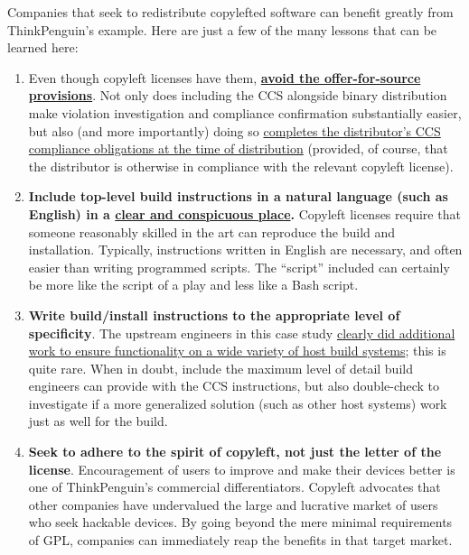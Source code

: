 Companies that seek to redistribute copylefted software can benefit greatly
from ThinkPenguin's example.  Here are just a few of the many lessons that
can be learned here:

\begin{enumerate}

\item Even though copyleft licenses have them,
  \hyperref[thinkpenguin-included-ccs]{\bf avoid the offer-for-source
    provisions}.  Not only does including the CCS alongside binary
  distribution make violation investigation and compliance confirmation
  substantially easier, but also (and more importantly) doing so
  \hyperref[offer-for-source]{completes the distributor's CCS compliance
    obligations at the time of distribution} (provided, of course, that the
  distributor is otherwise in compliance with the relevant copyleft license).
  
\item {\bf Include top-level build instructions in a natural language (such
  as English) in a \hyperref[thinkpenguin-toplevel-readme]{clear and
    conspicuous place}.}  Copyleft licenses require that someone reasonably
  skilled in the art can reproduce the build and installation.  Typically,
  instructions written in English are necessary, and often easier than writing
  programmed scripts.  The ``script'' included can
  certainly be more like the script of a play and less like a Bash script.

\item {\bf Write build/install instructions to the appropriate level of
  specificity}.  The upstream engineers
  in this case study \hyperref[thinkpenguin-specific-host-system]{clearly did
    additional work to ensure functionality on a wide variety of host build
    systems}; this is quite rare.  When in doubt, include the maximum level
  of detail build engineers can provide with the CCS instructions, but also
  double-check to investigate if a more generalized solution (such as other
  host systems) work just as well for the build.

\item {\bf Seek to adhere to the spirit of copyleft, not just the letter of
  the license}.  Encouragement of users to improve and
  make their devices better is one of ThinkPenguin's commercial differentiators.  Copyleft advocates
  that other companies have undervalued the large and lucrative
  market of
  users who seek hackable devices.  By going beyond the
  mere minimal requirements of GPL, companies can immediately reap the
  benefits in that target market.


\end{enumerate}
